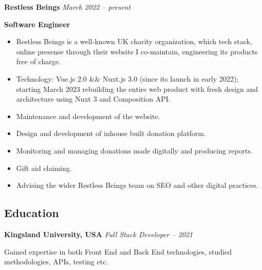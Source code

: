 \documentclass[11pt, oneside]{article}
\begin{document}
\medskip

\textbf{Restless Beings}
\hfill
\textit{March 2022 – present}

\textbf{Software Engineer}

\begin{itemize} 
  \item Restless Beings is a well-known UK charity organization, which tech stack, online presense through their website I co-maintain, engineering its products free of charge.
  \item Technology: Vue.js 2.0 && Nuxt.js 3.0 (since its launch in early 2022); starting March 2023 rebuilding the entire web product with fresh design and architecture using Nuxt 3 and Composition API.
  \item Maintenance and development of the website.
  \item Design and development of inhouse built donation platform.
  \item Monitoring and managing donations made digitally and producing reports.
  \item Gift aid claiming.
  \item Advising the wider Restless Beings team on SEO and other digital practices.

\end{itemize}

\medskip

\subsection*{Education}
\textbf{Kingsland University, USA}
\hfill
\textit{Full Stack Developer – 2021}

Gained expertise in both Front End and Back End technologies, studied methodologies, APIs, testing etc.
\end{document}
